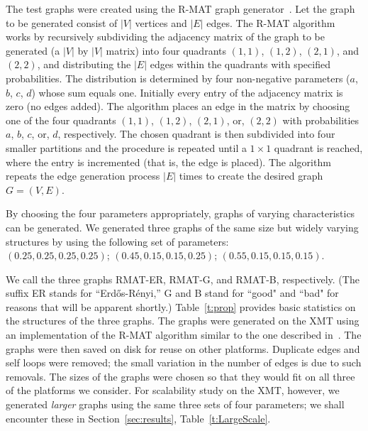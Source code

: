 \documentclass{article}
\begin{document}
The test graphs were created using the R-MAT graph generator~\cite{Chakrabarti}.
Let the graph to be generated consist of $|V|$ vertices and $|E|$ edges.
The R-MAT algorithm works by recursively subdividing the adjacency matrix of the graph to 
be generated (a $|V|$ by $|V|$ matrix) into four quadrants $(1,1)$, $(1,2)$, $(2,1)$, and
$(2,2)$, and distributing the $|E|$ edges within the quadrants with specified probabilities.
The distribution is determined by four non-negative parameters ($a$, $b$, $c$, $d$) 
whose sum equals one. Initially every entry of the adjacency matrix is zero (no edges added).
The algorithm places an edge in the matrix by choosing one of the four quadrants
$(1,1)$, $(1,2)$, $(2,1)$, or, $(2,2)$ with probabilities $a$, $b$, $c$, or, $d$, respectively.
The chosen quadrant is then subdivided into four smaller partitions and the procedure is
repeated until a $1 \times 1$ quadrant is reached, where the entry is incremented 
(that is, the edge is placed).
The algorithm repeats the edge generation process $|E|$ times to create the desired graph
$G=(V,E)$.  

By choosing the four parameters appropriately, graphs of varying characteristics can be generated. 
We generated three graphs of the same size but widely varying structures by 
using the following set of parameters: \\
$(0.25, 0.25, 0.25, 0.25)$; $(0.45, 0.15, 0.15, 0.25)$; $(0.55, 0.15, 0.15, 0.15)$. 

We call the three graphs RMAT-ER, RMAT-G, and RMAT-B, respectively.
(The suffix ER stands for ``Erd\H os-R\'enyi,''
G and B stand for ``good" and ``bad" for reasons that will be apparent shortly.)
Table~\ref{t:prop} provides basic statistics on the structures of the three graphs.
The graphs were generated on the XMT using an implementation of the R-MAT algorithm 
similar to the one  described in~\cite{SSCA}. 
The graphs were then saved on disk for reuse on other platforms. 
Duplicate edges and self loops were removed;
the small variation in the number of edges is due to such removals. 
The sizes of the graphs were chosen so that they would fit on 
all three of the platforms we consider. 
For scalability study on the XMT, however, we generated {\em larger} graphs 
using the same three sets of four parameters; 
we shall encounter these in Section~\ref{sec:results}, Table~\ref{t:LargeScale}.
\end{document}
